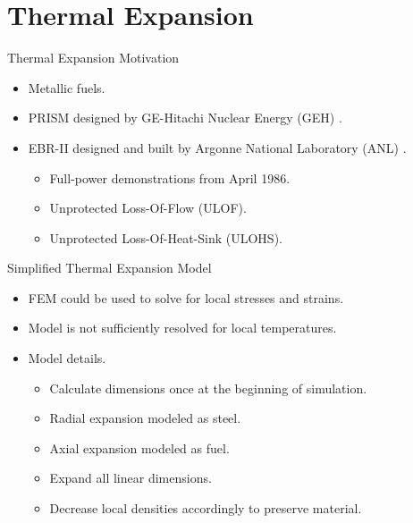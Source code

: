 \section{Thermal Expansion}
\label{sec:thermalExpansion}

\begin{frame}{Thermal Expansion Motivation}
  \begin{itemize}
    \item Metallic fuels.
    \item PRISM designed by GE-Hitachi Nuclear Energy (GEH) \cite{GEFR793}.
    \item EBR-II designed and built by Argonne National Laboratory (ANL)
      \cite{PlentifulEnergy}.
      \begin{itemize}
        \item Full-power demonstrations from April 1986.
        \item Unprotected Loss-Of-Flow (ULOF).
        \item Unprotected Loss-Of-Heat-Sink (ULOHS).
      \end{itemize}
  \end{itemize}
\end{frame}

\begin{frame}{Simplified Thermal Expansion Model}
  \begin{itemize}
    \item FEM could be used to solve for local stresses and strains.
    \item Model is not sufficiently resolved for local temperatures.
    \item Model details.
    \begin{itemize}
      \item Calculate dimensions once at the beginning of simulation.
      \item Radial expansion modeled as steel.
      \item Axial expansion modeled as fuel.
      \item Expand all linear dimensions.
      \item Decrease local densities accordingly to preserve material.
    \end{itemize}
  \end{itemize}
\end{frame}

